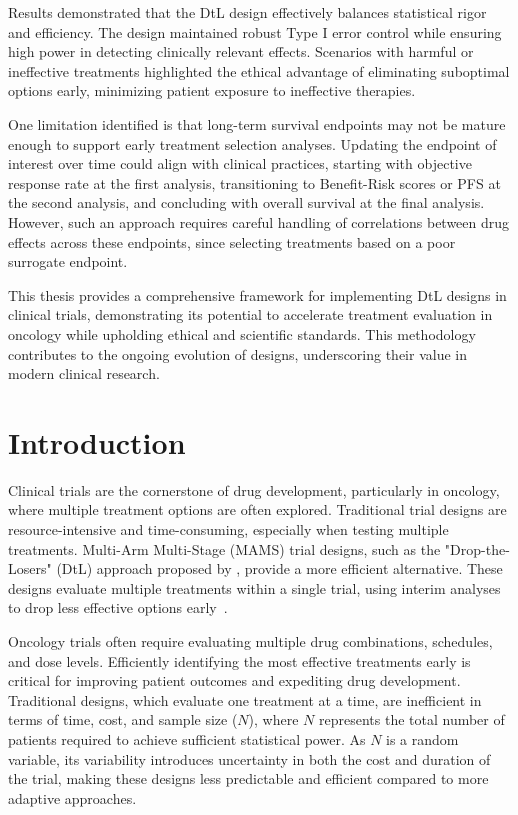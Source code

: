 \documentclass[11pt, a4paper]{article}\usepackage[]{graphicx}\usepackage[]{xcolor}
\begin{document}
Results demonstrated that the DtL design effectively balances statistical rigor and efficiency. The design maintained robust Type I error control while ensuring high power in detecting clinically relevant effects. Scenarios with harmful or ineffective treatments highlighted the ethical advantage of eliminating suboptimal options early, minimizing patient exposure to ineffective therapies.

One limitation identified is that long-term survival endpoints may not be mature enough to support early treatment selection analyses. Updating the endpoint of interest over time could align with clinical practices, starting with objective response rate at the first analysis, transitioning to Benefit-Risk scores or PFS at the second analysis, and concluding with overall survival at the final analysis. However, such an approach requires careful handling of correlations between drug effects across these endpoints, since selecting treatments based on a poor surrogate endpoint.

This thesis provides a comprehensive framework for implementing DtL designs in clinical trials, demonstrating its potential to accelerate treatment evaluation in oncology while upholding ethical and scientific standards. This methodology contributes to the ongoing evolution of designs, underscoring their value in modern clinical research.



\newpage
\section{Introduction} \label{sec:intro}

Clinical trials are the cornerstone of drug development, particularly in oncology, where multiple treatment options are often explored. Traditional trial designs are resource-intensive and time-consuming, especially when testing multiple treatments. Multi-Arm Multi-Stage (MAMS) trial designs, such as the "Drop-the-Losers" (DtL) approach proposed by \cite{Wason2017DropTheLosers}, provide a more efficient alternative. These designs evaluate multiple treatments within a single trial, using interim analyses to drop less effective options early~\citep{BauerKieser1999}.

Oncology trials often require evaluating multiple drug combinations, schedules, and dose levels. Efficiently identifying the most effective treatments early is critical for improving patient outcomes and expediting drug development. Traditional designs, which evaluate one treatment at a time, are inefficient in terms of time, cost, and sample size (\(N\)), where \(N\) represents the total number of patients required to achieve sufficient statistical power. As \(N\) is a random variable, its variability introduces uncertainty in both the cost and duration of the trial, making these designs less predictable and efficient compared to more adaptive approaches.
\end{document}
